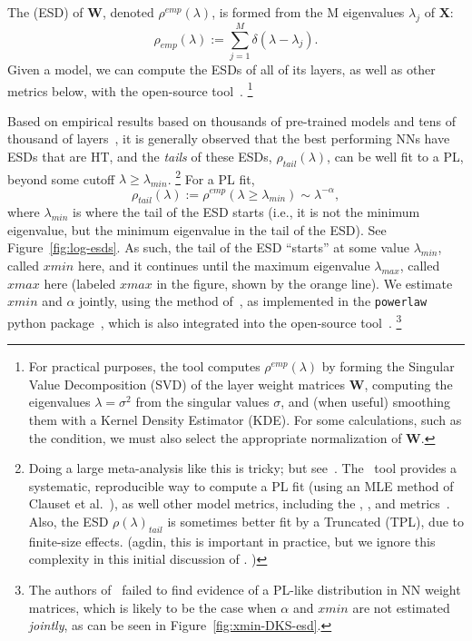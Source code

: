 \noindent
The \EmpiricalSpectralDensity (ESD) of $\mathbf{W}$, denoted $\rho^{emp}(\lambda)$, is formed from the M eigenvalues $\lambda_{j}$ of $\mathbf{X}$:
\begin{equation}
\rho_{emp}(\lambda):=\sum_{j=1}^{M}\delta(\lambda-\lambda_{j}) .
\label{eqn:rho}
\end{equation}
Given a model, we can compute the ESDs of all of its layers, as well as other metrics below,
with the open-source \WW tool~\cite{WW}.%
\footnote{For practical purposes, the \WW tool computes $\rho^{emp}(\lambda)$ by forming the Singular Value Decomposition (SVD) of the layer weight matrices $\mathbf{W}$, computing the eigenvalues $\lambda=\sigma^{2}$ from the singular values $\sigma$, and (when useful) smoothing them with a Kernel Density Estimator (KDE). For some calculations, such as the \TRACELOG condition, we must also select the appropriate normalization of $\mathbf{W}$.}


Based on empirical results based on thousands of pre-trained models and tens of thousand of layers~\cite{MM18_TR_JMLRversion,MM20a_trends_NatComm,MM21a_simpsons_TR,YTHx23_KDD}, 
it is generally observed that the 
best performing NNs have ESDs that are HT, and the \emph{tails} of these ESDs, $\rho_{tail}(\lambda)$, can be well fit to a PL, beyond some cutoff $\lambda\ge\lambda_{min}$.%
\footnote{Doing a large meta-analysis like this is tricky; but see~\cite{MM18_TR_JMLRversion,MM20a_trends_NatComm,MM21a_simpsons_TR,YTHx23_KDD}.  The \WW~tool provides a systematic, reproducible way to compute a PL fit (using an MLE method of Clauset et al.~\cite{CSN09_powerlaw}), as well other model metrics, including the \SPECTRALNORM, \RANDDIST, and \ALPHAHAT metrics~\cite{MM20a_trends_NatComm}.  Also, the ESD $\rho(\lambda)_{tail}$ is sometimes better fit by a Truncated \PowerLaw (TPL), due to finite-size effects.
(agdin, this is important in practice, but we ignore this complexity in this initial discussion of \SETOL. ) }
For a PL fit,
\begin{equation}
\rho_{tail}(\lambda):=\rho^{emp}(\lambda\ge\lambda_{min})\sim\lambda^{-\alpha} ,
\label{eqn:rho_tail}
\end{equation}
where $\lambda_{min}$ is where the tail of the ESD starts (i.e., it is not the minimum eigenvalue, but the minimum eigenvalue in the tail of the ESD). 
See Figure~\ref{fig:log-esds}.
As such, the tail of the ESD ``starts'' at some value $\lambda_{min}$, called $xmin$ here, and it continues until the 
maximum eigenvalue $\lambda_{max}$, called $xmax$ here
(labeled $xmax$ in the figure, shown by the orange line).
We estimate $xmin$ and $\alpha$ jointly, using the method of~\cite{CSN09_powerlaw}, 
as implemented in the \texttt{powerlaw} python package~\cite{ABP14}, 
which is also integrated into the open-source \WW tool~\cite{MM20a_trends_NatComm, WW}.%
\footnote{The authors of~\cite{Thamm2022} failed to find evidence of a PL-like distribution in NN weight matrices, which is 
likely to be the case when $\alpha$ and $xmin$ are not estimated \emph{jointly}, as can be seen in Figure~\ref{fig:xmin-DKS-esd}.  }



